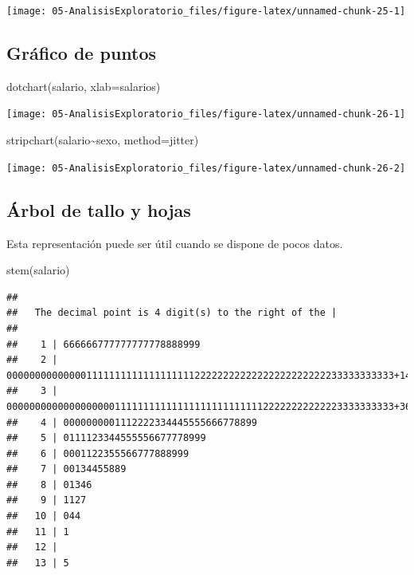 \documentclass[
]{book}
\newenvironment{Shaded}{\begin{snugshade}}{\end{snugshade}}
\newcommand{\AttributeTok}[1]{\textcolor[rgb]{0.77,0.63,0.00}{#1}}
\newcommand{\FunctionTok}[1]{\textcolor[rgb]{0.00,0.00,0.00}{#1}}
\newcommand{\NormalTok}[1]{#1}
\newcommand{\SpecialCharTok}[1]{\textcolor[rgb]{0.00,0.00,0.00}{#1}}
\newcommand{\StringTok}[1]{\textcolor[rgb]{0.31,0.60,0.02}{#1}}
\theoremstyle{break}
\begin{document}
\begin{center}\texttt{[image: 05-AnalisisExploratorio\_files/figure-latex/unnamed-chunk-25-1]} \end{center}

\hypertarget{gruxe1fico-de-puntos}{%
\subsection{Gráfico de puntos}\label{gruxe1fico-de-puntos}}

\begin{Shaded}
\begin{Highlighting}[]
\FunctionTok{dotchart}\NormalTok{(salario, }\AttributeTok{xlab=}\StringTok{\textquotesingle{}salarios\textquotesingle{}}\NormalTok{)}
\end{Highlighting}
\end{Shaded}

\begin{center}\texttt{[image: 05-AnalisisExploratorio\_files/figure-latex/unnamed-chunk-26-1]} \end{center}

\begin{Shaded}
\begin{Highlighting}[]
\FunctionTok{stripchart}\NormalTok{(salario}\SpecialCharTok{\textasciitilde{}}\NormalTok{sexo, }\AttributeTok{method=}\StringTok{\textquotesingle{}jitter\textquotesingle{}}\NormalTok{)}
\end{Highlighting}
\end{Shaded}

\begin{center}\texttt{[image: 05-AnalisisExploratorio\_files/figure-latex/unnamed-chunk-26-2]} \end{center}

\hypertarget{uxe1rbol-de-tallo-y-hojas}{%
\subsection{Árbol de tallo y hojas}\label{uxe1rbol-de-tallo-y-hojas}}

Esta representación puede ser útil cuando se dispone de pocos datos.

\begin{Shaded}
\begin{Highlighting}[]
\FunctionTok{stem}\NormalTok{(salario)}
\end{Highlighting}
\end{Shaded}

\begin{verbatim}
## 
##   The decimal point is 4 digit(s) to the right of the |
## 
##    1 | 666666777777777778888999
##    2 | 00000000000000111111111111111111122222222222222222222222233333333333+148
##    3 | 00000000000000000001111111111111111111111111122222222222223333333333+36
##    4 | 0000000001112222334445555666778899
##    5 | 0111123344555556677778999
##    6 | 0001122355566777888999
##    7 | 00134455889
##    8 | 01346
##    9 | 1127
##   10 | 044
##   11 | 1
##   12 | 
##   13 | 5
\end{verbatim}
\end{document}
